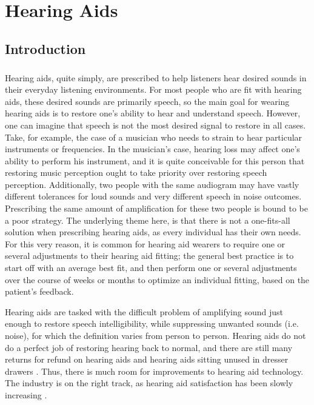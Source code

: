 \chapter{Hearing Aids}

\section{Introduction}
\paragraph{}Hearing aids, quite simply, are prescribed to help listeners hear desired sounds in their everyday listening environments.  For most people who are fit with hearing aids, these desired sounds are primarily speech, so the main goal for wearing hearing aids is to restore one's ability to hear and understand speech.  However, one can imagine that speech is not the most desired signal to restore in all cases.  Take, for example, the case of a musician who needs to strain to hear particular instruments or frequencies.  In the musician's case, hearing loss may affect one's ability to perform his instrument, and it is quite conceivable for this person that restoring music perception ought to take priority over restoring speech perception.  Additionally, two people with the same audiogram may have vastly different tolerances for loud sounds and very different speech in noise outcomes.  Prescribing the same amount of amplification for these two people is bound to be a poor strategy.  The underlying theme here, is that there is not a one-fits-all solution when prescribing hearing aids, as every individual has their own needs.  For this very reason, it is common for hearing aid wearers to require one or several adjustments to their hearing aid fitting; the general best practice is to start off with an average best fit, and then perform one or several adjustments over the course of weeks or months to optimize an individual fitting, based on the patient's feedback.

Hearing aids are tasked with the difficult problem of amplifying sound just enough to restore speech intelligibility, while suppressing unwanted sounds (i.e. noise), for which the definition varies from person to person.  Hearing aids do not do a perfect job of restoring hearing back to normal, and there are still many returns for refund on hearing aids and hearing aids sitting unused in dresser drawers \cite{Kochkin2010b}.  Thus, there is much room for improvements to hearing aid technology.  The industry is on the right track, as hearing aid satisfaction has been slowly increasing \cite{Kochkin2010a}.


